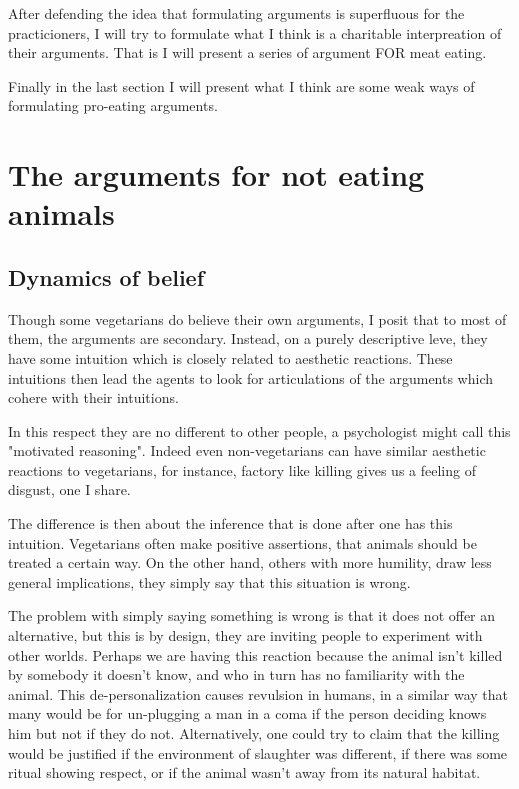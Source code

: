 \documentclass[12pt]{report}
\numberwithin{equation}{section}
\begin{document}
After defending the idea that formulating arguments is superfluous for the practicioners, I will try to formulate what I think is a charitable interpreation of their arguments. That is I will present a series of argument FOR meat eating. 

Finally in the last section I will present what I think are some weak ways of formulating pro-eating arguments. 

\chapter{The arguments for not eating animals}

\section{Dynamics of belief}

Though some vegetarians do believe their own arguments, I posit that to most of them, the arguments are secondary. Instead, on a purely descriptive leve, they have some intuition which is closely related to aesthetic reactions. These intuitions then lead the agents to look for articulations of the arguments which cohere with their intuitions. 

In this respect they are no different to other people, a psychologist might call this "motivated reasoning". Indeed even non-vegetarians can have similar aesthetic reactions to vegetarians, for instance, factory like killing gives us a feeling of disgust, one I share. 

The difference is then about the inference that is done after one has this intuition. Vegetarians often make positive assertions, that animals should be treated a certain way. On the other hand, others with more humility, draw less general implications, they simply say that this situation is wrong. 

The problem with simply saying something is wrong is that it does not offer an alternative, but this is by design, they are inviting people to experiment with other worlds. Perhaps we are having this reaction because the animal isn't killed by somebody it doesn't know, and who in turn has no familiarity with the animal. This de-personalization causes revulsion in humans, in a similar way that many would be for un-plugging a man in a coma if the person deciding knows him but not if they do not. Alternatively, one could try to claim that the killing would be justified if the environment of slaughter was different, if there was some ritual showing respect, or if the animal wasn't away from its natural habitat. 
\end{document}
